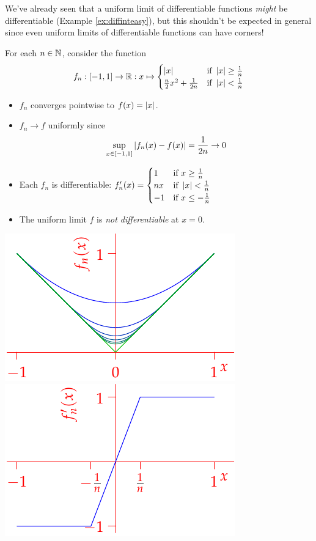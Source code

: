 
We've already seen that a uniform limit of differentiable functions \emph{might} be differentiable (Example \ref{ex:diffinteasy}), but this shouldn't be expected in general since even uniform limits of differentiable functions can have corners!

\begin{example}[lower separated=false, sidebyside, sidebyside align=top seam, sidebyside gap=0pt, righthand width=0.4\linewidth]{}{}
For each $n\in\mathbb{N}$, consider the function
\[f_n:[-1,1]\to\mathbb{R}:x\mapsto \begin{cases}
\left| x\right|&\text{if }\left| x\right|\ge\frac 1n\\
\frac n2x^2+\frac 1{2n}&\text{if }\left| x\right|<\frac 1n
\end{cases}\]
\begin{itemize}
  \item $f_n$ converges pointwise to \textcolor{Green}{$f(x)=\left| x\right|$}.
  \item $f_n\to f$ uniformly since\vspace{-5pt}
  \[\sup_{x\in[-1,1]}\left| f_n(x)-f(x)\right|=\frac 1{2n}\to 0\]\vspace{-15pt}
 	\item Each $f_n$ is differentiable: $f'_n(x)=\begin{cases}
  1&\text{if }x\ge\frac 1n\\
  nx&\text{if }\left| x\right|<\frac 1n\\
  -1&\text{if }x\le -\frac 1n
  \end{cases}$
  \item The uniform limit $f$ is \emph{not differentiable} at $x=0$.
\end{itemize}
\tcblower
\flushright\includegraphics{seqex9}\\
\includegraphics{seqex9-1}
\end{example}\goodbreak


